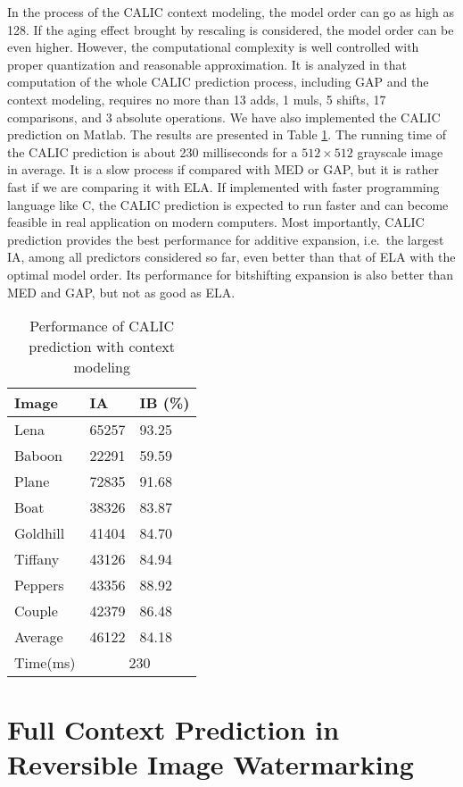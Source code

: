 \documentclass[journal]{IEEEtran}
\begin{document}
In the process of the CALIC context modeling, the model order can go as high as 128. If the
aging effect brought by rescaling is considered, the model order can be even higher. However, the
computational complexity is well controlled with proper quantization and reasonable approximation.
It is analyzed in \cite{Wu97calic2} that computation of the whole CALIC prediction process,
including GAP and the context modeling, requires no more than 13 adds, 1 muls, 5 shifts, 17
comparisons, and 3 absolute operations. We have also implemented the CALIC prediction on Matlab. The
results are presented in Table \ref{tbl:calicpfm}. The running time of the CALIC prediction is about
230 milliseconds for a $512 \times 512$ grayscale image in average. It is a slow process if compared
with MED or GAP, but it is rather fast if we are comparing it with ELA. If implemented with faster
programming language like C, the CALIC prediction is expected to run faster and can become feasible
in real application on modern computers. Most importantly, CALIC prediction provides the best
performance for additive expansion, i.e.\ the largest IA, among all predictors considered so far,
even better than that of ELA with the optimal model order. Its performance for bitshifting expansion
is also better than MED and GAP, but not as good as ELA. 

\begin{table}[t]
    \centering
    \caption{\label{tbl:calicpfm}Performance of CALIC prediction with context modeling}
    \begin{tabular}{lll}\hline\hline
	Image & IA & IB (\%) \\\hline
	Lena	& 65257 & 93.25 \\
	Baboon	& 22291 & 59.59 \\
	Plane	& 72835 & 91.68 \\
	Boat	& 38326 & 83.87 \\
	Goldhill& 41404 & 84.70 \\
	Tiffany	& 43126 & 84.94 \\
	Peppers	& 43356 & 88.92 \\
	Couple	& 42379 & 86.48 \\
	Average	& 46122 & 84.18 \\
	Time(ms)& \multicolumn{2}{c}{230}\\\hline\hline
    \end{tabular}
\end{table}

\section{Full Context Prediction in Reversible Image Watermarking}\label{sec:full}
\end{document}
